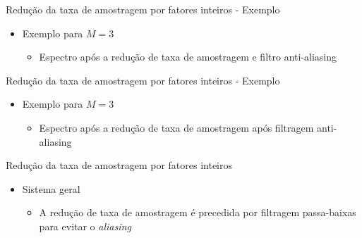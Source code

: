 \begin{slide}{Redução da taxa de amostragem por fatores inteiros - Exemplo}
	\begin{itemize}
		\item Exemplo para $M=3$
			\begin{itemize}
		\item Espectro após a redução de taxa de amostragem e filtro anti-aliasing
			\begin{figure}
				\centering
		        \end{figure}
			\end{itemize}
	\end{itemize}
\end{slide}
\begin{slide}{Redução da taxa de amostragem por fatores inteiros - Exemplo}
	\begin{itemize}
		\item Exemplo para $M=3$
			\begin{itemize}
		\item Espectro após a redução de taxa de amostragem após filtragem anti-aliasing
			\begin{figure}
				\centering
		        \end{figure}
			\end{itemize}
	\end{itemize}
\end{slide}
\begin{slide}{Redução da taxa de amostragem por fatores inteiros}
	\begin{itemize}
		\item Sistema geral
			\begin{itemize}
				\item A redução de taxa de amostragem é precedida por filtragem passa-baixas para evitar o \emph{aliasing}
				\begin{figure}
					\centering
		        	\end{figure}
			\end{itemize}
	\end{itemize}
\end{slide}

